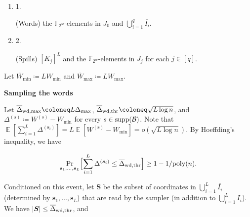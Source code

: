 \begin{enumerate}


\item[] 
1. 


(Words) the $\mathbb{F}_{2^{w}}$-elements in $J_{0}$ and $\bigcup_{i=1}^{q}\overline{I_{i}}$.\par





\item[] 
2. 


(Spills) $[K_{j}]^{L}$ and the $\mathbb{F}_{2^{w}}$-elements in $J_{j}$ for each $j\in[q]$.\par





\end{enumerate}




Let $\overline{W}_{\min}\coloneq LW_{\min}$ and $\overline{W}_{\max}\coloneq LW_{\max}$.\par




\par\medskip\noindent\textbf{Sampling the words}\par




Let $\overline{\Delta}_{{\rm wd},\max}\coloneq L\Delta_{\max}$, $\overline{\Delta}_{{\rm wd},{\rm thr}}\coloneq\sqrt{L\log n}$, and $\Delta^{(s)}\coloneq W^{(s)}-W_{\min}$ for every $s\in{\rm supp}(\mathcal{B})$.
Note that $\operatorname{\mathbb{E}}[\sum_{i=1}^{L}\Delta^{(\boldsymbol{s}_{i})}]=L\operatorname{\mathbb{E}}[W^{(\boldsymbol{s})}-W_{\min}]=o(\sqrt{L\log n})$.
By Hoeffding’s inequality, we have\par


\[\begin{gathered}
\Pr_{\boldsymbol{s}_{1},\ldots,\boldsymbol{s}_{L}}\Bigl[\sum_{i=1}^{L}\Delta^{(\boldsymbol{s}_{i})}\leq\overline{\Delta}_{{\rm wd},{\rm thr}}\Bigr]\geq 1-1/\textnormal{poly}(n).
\end{gathered}\]


Conditioned on this event, let $\boldsymbol{S}$ be the subset of coordinates in $\bigcup_{i=1}^{L}\overline{I_{i}}$ (determined by $\boldsymbol{s}_{1},\ldots,\boldsymbol{s}_{L}$) that are read by the sampler (in addition to $\bigcup_{i=1}^{L}I_{i}$).
We have $\lvert\boldsymbol{S}\rvert\leq\overline{\Delta}_{{\rm wd},{\rm thr}}$, and\par


